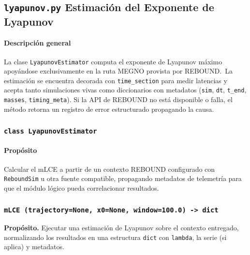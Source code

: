 \subsection{\texttt{lyapunov.py} \- Estimación del Exponente de Lyapunov}
\paragraph{Descripción general}
La clase \texttt{LyapunovEstimator} computa el exponente de Lyapunov máximo apoyándose exclusivamente en la ruta MEGNO provista por REBOUND.\ La estimación se encuentra decorada con \texttt{time\_section} para medir latencias y acepta tanto simulaciones vivas como diccionarios con metadatos (\texttt{sim}, \texttt{dt}, \texttt{t\_end}, \texttt{masses}, \texttt{timing\_meta}). Si la API de REBOUND no está disponible o falla, el método retorna un registro de error estructurado propagando la causa.\\

\subsubsection{\texttt{class LyapunovEstimator}}
\paragraph{Propósito} Calcular el mLCE a partir de un contexto REBOUND configurado con \texttt{ReboundSim} u otra fuente compatible, propagando metadatos de telemetría para que el módulo lógico pueda correlacionar resultados.\\

\subsubsection*{\texttt{mLCE~(trajectory=None, x0=None, window=100.0) -> dict}}
\textbf{Propósito.} Ejecutar una estimación de Lyapunov sobre el contexto entregado, normalizando los resultados en una estructura \texttt{dict} con \texttt{lambda}, la serie (si aplica) y metadatos.\\

